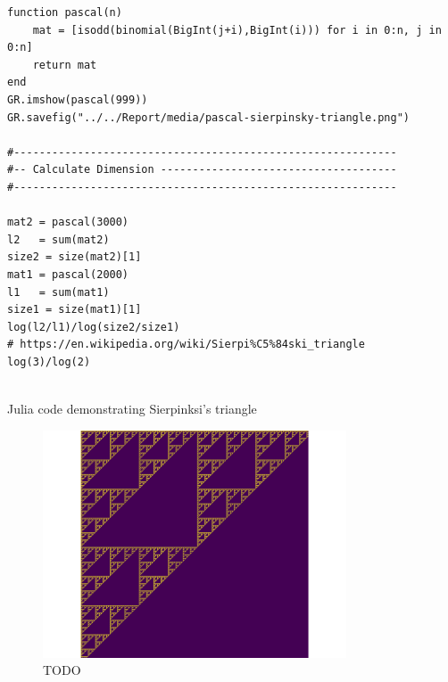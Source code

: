 \documentclass[11pt]{article}
\begin{document}
\begin{listing}[htbp]
\begin{verbatim}
function pascal(n)
    mat = [isodd(binomial(BigInt(j+i),BigInt(i))) for i in 0:n, j in 0:n]
    return mat
end
GR.imshow(pascal(999))
GR.savefig("../../Report/media/pascal-sierpinsky-triangle.png")

#------------------------------------------------------------
#-- Calculate Dimension -------------------------------------
#------------------------------------------------------------

mat2 = pascal(3000)
l2   = sum(mat2)
size2 = size(mat2)[1]
mat1 = pascal(2000)
l1   = sum(mat1)
size1 = size(mat1)[1]
log(l2/l1)/log(size2/size1)
# https://en.wikipedia.org/wiki/Sierpi%C5%84ski_triangle
log(3)/log(2)


\end{verbatim}
\caption{\label{pascal-triangle-sierpinski}Julia code demonstrating Sierpinksi's triangle}
\end{listing}

\begin{figure}[htbp]
\centering
\includegraphics[width=9cm]{media/pascal-sierpinsky-triangle.png}
\caption{\label{fig:pascal-sierpinsky}TODO}
\end{figure}
\end{document}
